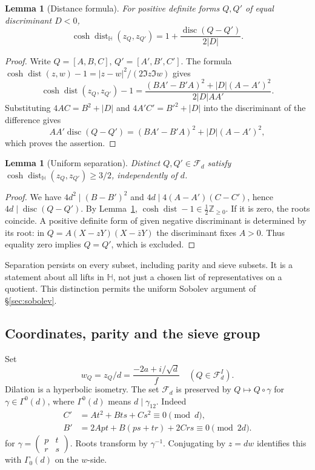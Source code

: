 \documentclass[10pt,reqno]{amsart}
\newtheorem{lemma}[theorem]{Lemma}
\theoremstyle{definition}
\numberwithin{equation}{section}
\newcommand{\Z}{\mathbb Z}
\newcommand{\HH}{\mathbb H}
\newcommand{\cF}{\mathcal F}
\DeclareMathOperator{\disc}{disc}
\begin{document}
\begin{lemma}[Distance formula]\label{L:2.1}
For positive definite forms $Q,Q'$ of equal discriminant $D<0$,
\[
 \cosh\operatorname{dist}_{\HH}(z_Q,z_{Q'})
             =1+\frac{\disc(Q-Q')}{2|D|}.
\]
\end{lemma}
\begin{proof}
Write $Q=[A,B,C]$, $Q'=[A',B',C']$. The formula
$\cosh\operatorname{dist}(z,w)-1=|z-w|^2/(2\Im z\Im w)$ gives
\[
 \cosh\operatorname{dist}(z_Q,z_{Q'})-1
 =\frac{(BA'-B'A)^2+|D|(A-A')^2}{2|D|AA'}.
\]
Substituting $4AC=B^2+|D|$ and $4A'C'=B'^2+|D|$ into the discriminant
of the difference gives
\[
 AA'\disc(Q-Q')=(BA'-B'A)^2+|D|(A-A')^2,
\]
which proves the assertion.
\end{proof}
\begin{lemma}[Uniform separation]\label{L:2.2}
Distinct $Q,Q'\in\cF_d$ satisfy
$\cosh\operatorname{dist}_{\HH}(z_Q,z_{Q'})\ge3/2$, independently of $d$.
\end{lemma}
\begin{proof}
We have $4d^2\mid(B-B')^2$ and $4d\mid4(A-A')(C-C')$, hence
$4d\mid\disc(Q-Q')$. By Lemma~\ref{L:2.1},
$\cosh\operatorname{dist}-1\in\frac12\Z_{\ge0}$.
If it is zero, the roots coincide. A positive definite form of given
negative discriminant is determined by its root: in
$Q=A(X-zY)(X-\bar zY)$ the discriminant fixes $A>0$.
Thus equality zero implies $Q=Q'$, which is excluded.
\end{proof}
Separation persists on every subset, including parity and sieve subsets.
It is a statement about all lifts in $\HH$, not just a chosen list of
representatives on a quotient. This distinction permits the uniform
Sobolev argument of \S\ref{sec:sobolev}.

\subsection{Coordinates, parity and the sieve group}
Set
\begin{equation}\label{A:eq:wcoord}
 w_Q=z_Q/d=\frac{-2a+i/\sqrt d}{f}\quad(Q\in\cF_d^I).
\end{equation}
Dilation is a hyperbolic isometry. The set $\cF_d$ is preserved by
$Q\mapsto Q\circ\gamma$ for $\gamma\in\Gamma^0(d)$, where
$\Gamma^0(d)$ means $d\mid\gamma_{12}$. Indeed
\begin{align*}
 C'&=At^2+Bts+Cs^2\equiv0\pmod d,\\
 B'&=2Apt+B(ps+tr)+2Crs\equiv0\pmod{2d}.
\end{align*}
for $\gamma=\left(\begin{smallmatrix}p&t\\r&s\end{smallmatrix}\right)$.
Roots transform by $\gamma^{-1}$. Conjugating by $z=dw$ identifies this
with $\Gamma_0(d)$ on the $w$-side.
\end{document}

